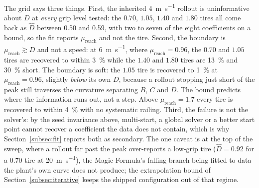 The grid says three things. First, the inherited \SI{4}{\meter\per\second}
rollout is uninformative about $D$ at \emph{every} grip level tested: the
$0.70$, $1.05$, $1.40$ and $1.80$ tires all come back as $\hat D$ between
\num{0.50} and \num{0.59}, with two to seven of the eight coefficients on a
bound, so the fit reports $\mu_{\mathrm{reach}}$ and not the tire. Second, the
boundary is $\mu_{\mathrm{reach}}\gtrsim D$ and not a speed: at
\SI{6}{\meter\per\second}, where $\mu_{\mathrm{reach}}=0.96$, the $0.70$ and
$1.05$ tires are recovered to within \SI{3}{\percent} while the $1.40$ and
$1.80$ tires are \SI{13}{\percent} and \SI{30}{\percent} short. The boundary is
soft: the $1.05$ tire is recovered to \SI{1}{\percent} at
$\mu_{\mathrm{reach}}=0.96$, slightly \emph{below} its own $D$, because a
rollout stopping just short of the peak still traverses the curvature
separating $B$, $C$ and $D$. The bound predicts where the information runs out,
not a step. Above $\mu_{\mathrm{reach}}=1.7$ every tire is recovered to within
\SI{4}{\percent} with no systematic railing. Third, the failure is not the
solver's: by the seed invariance above, multi-start, a global solver or a
better start point cannot recover a coefficient the data does not contain,
which is why Section~\ref{subsec:fit} reports both as secondary. The one caveat
is at the top of the sweep, where a rollout far past the peak over-reports a
low-grip tire ($\hat D=\num{0.92}$ for a $0.70$ tire at
\SI{20}{\meter\per\second}), the Magic Formula's falling branch being fitted to
data the plant's own curve does not produce; the extrapolation bound of
Section~\ref{subsec:iterative} keeps the shipped configuration out of that
regime.

